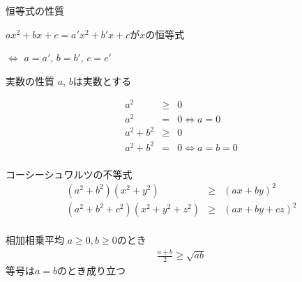 \documentclass[aspectratio=169, 12pt]{beamer} %
\begin{document}
\begin{frame}{恒等式の性質}
    \begin{center}
        $ax^2+bx+c=a'x^2+b'x+c$が$x$の恒等式\par
        $\Leftrightarrow$ \space $a=a'$, $b=b'$, $c=c'$
    \end{center}
\end{frame}
\begin{frame}{実数の性質}
    $a$, $b$は実数とする \par
    \begin{eqnarray*}
        a^2 &\geq& 0 \\
        a^2 &=&0 \Leftrightarrow a=0 \\
        a^2+b^2&\geq& 0 \\
        a^2+b^2&=&0 \Leftrightarrow a=b=0 \\
    \end{eqnarray*}
\end{frame}
\begin{frame}{コーシーシュワルツの不等式}
    \begin{eqnarray*}
        (a^2+b^2)(x^2+y^2)&\geq& (ax+by)^2 \\
        (a^2+b^2+c^2)(x^2+y^2+z^2)&\geq& (ax+by+cz)^2 \\
    \end{eqnarray*}
\end{frame}
\begin{frame}{相加相乗平均}
    $a\geq0, b\geq0$のとき
    \begin{eqnarray*}
        \frac{a+b}{2}\geq \sqrt{ab}
    \end{eqnarray*}
    等号は$a=b$のとき成り立つ
\end{frame}
\end{document}
